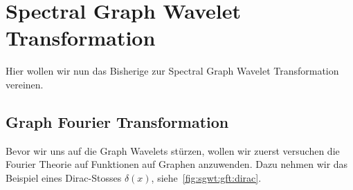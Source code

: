 
\section{Spectral Graph Wavelet Transformation\label{sec:sgwt:wavelets}}

Hier wollen wir nun das Bisherige zur Spectral Graph Wavelet Transformation 
vereinen.

\subsection{Graph Fourier Transformation\label{subsec:sgwt:gft}}

Bevor wir uns auf die Graph Wavelets st\"urzen, wollen wir zuerst versuchen die 
Fourier Theorie auf Funktionen auf Graphen anzuwenden. Dazu nehmen wir das 
Beispiel eines Dirac-Stosses $\delta(x)$, siehe~\cref{fig:sgwt:gft:dirac}.
